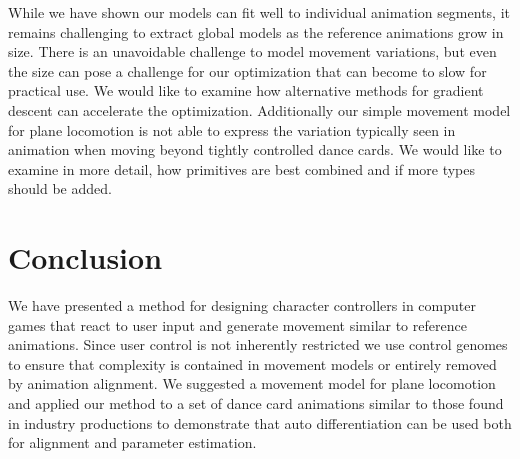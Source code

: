While we have shown our models can fit well to individual animation segments, it remains challenging to extract global models as the reference animations grow in size. There is an unavoidable challenge to model movement variations, but even the size can pose a challenge for our optimization that can become to slow for practical use. We would like to examine how alternative methods for gradient descent can accelerate the optimization. 
Additionally our simple movement model for plane locomotion is not able to express the variation typically seen in animation when moving beyond tightly controlled dance cards. We would like to examine in more detail, how primitives are best combined and if more types should be added.

\section{Conclusion}
We have presented a method for designing character controllers in computer games that react to user input and generate movement similar to reference animations. Since user control is not inherently restricted we use control genomes to ensure that complexity is contained in movement models or entirely removed by animation alignment. We suggested a movement model for plane locomotion and applied our method to a set of dance card animations similar to those found in industry productions to demonstrate that auto differentiation can be used both for alignment and parameter estimation.  
